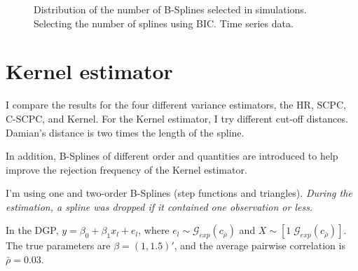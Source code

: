 \documentclass[
]{article}
\begin{document}
\begin{figure}

\begin{minipage}[t]{0.50\linewidth}

{\centering 


}

\end{minipage}%
%
\begin{minipage}[t]{0.50\linewidth}

{\centering 


}

\end{minipage}%

\caption{\label{fig-bic-splines-ts}Distribution of the number of
B-Splines selected in simulations. Selecting the number of splines using
BIC. Time series data.}

\end{figure}

\hypertarget{sec-kernel}{%
\section{Kernel estimator}\label{sec-kernel}}

I compare the results for the four different variance estimators, the
HR, SCPC, C-SCPC, and Kernel. For the Kernel estimator, I try different
cut-off distances. Damian's distance is two times the length of the
spline.

In addition, B-Splines of different order and quantities are introduced
to help improve the rejection frequency of the Kernel estimator.

I'm using one and two-order B-Splines (step functions and triangles).
\emph{During the estimation, a spline was dropped if it contained one
observation or less.}

In the DGP, \(y=\beta_0 + \beta_1 x_l +e_l\), where
\(e_l\sim\mathcal{G}_{exp}(c_{\bar\rho})\) and
\(X\sim[1 \;\mathcal{G}_{exp}(c_{\bar\rho})]\). The true parameters are
\(\beta=(1, 1.5)'\), and the average pairwise correlation is
\(\bar\rho=0.03\).
\end{document}

